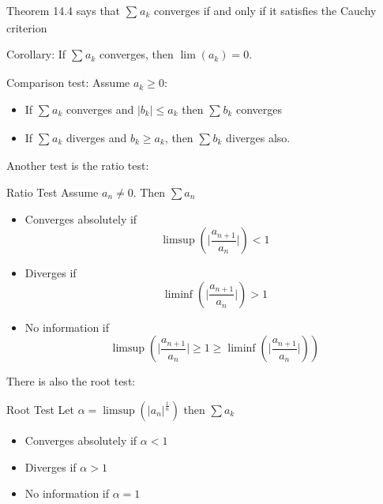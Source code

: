 \documentclass{report}
\begin{document}
Theorem 14.4 says that $\sum_{}^{} a_{k}$ converges if and only if it satisfies the Cauchy criterion

Corollary: If $\sum_{}^{} a_{k}$ converges, then $\lim(a_{k}) = 0$.

Comparison test: Assume $a_{k} \geq 0$:
    \begin{itemize}
        \item If $\sum_{}^{} a_{k}$ converges and $\lvert b_{k} \rvert \leq a_{k}$ then $\sum_{}^{} b_{k}$ converges

        \item If $\sum_{}^{} a_{k}$ diverges and $b_{k} \geq a_{k}$, then $\sum_{}^{} b_{k}$ diverges also.
    \end{itemize}

Another test is the ratio test:

\begin{theorem}{Ratio Test}
    Assume $a_{n} \neq 0$. Then $\sum a_{n}$
        \begin{itemize}
            \item Converges absolutely if 
                \begin{equation*}
                    \limsup(\lvert \dfrac{a_{n + 1}}{a_{n}} \rvert) < 1
                \end{equation*}

            \item Diverges if 
                \begin{equation*}
                    \liminf(\lvert \dfrac{a_{n + 1}}{a_{n}} \rvert) > 1
                \end{equation*}

            \item No information if 
                \begin{equation*}
                    \limsup(\lvert \dfrac{a_{n + 1}}{a_{n}} \rvert \geq 1 \geq \liminf(\lvert \dfrac{a_{n + 1}}{a_{n}} \rvert))
                \end{equation*}
        \end{itemize}
\end{theorem}

There is also the root test:

\begin{theorem}{Root Test}
    Let $\alpha = \limsup(\lvert a_{n} \rvert^{\frac{1}{n}})$ then $\sum a_{k}$
        \begin{itemize}
            \item Converges absolutely if $\alpha < 1$

            \item Diverges if $\alpha > 1$

            \item No information if $\alpha = 1$ 
        \end{itemize}
\end{theorem}
\end{document}
